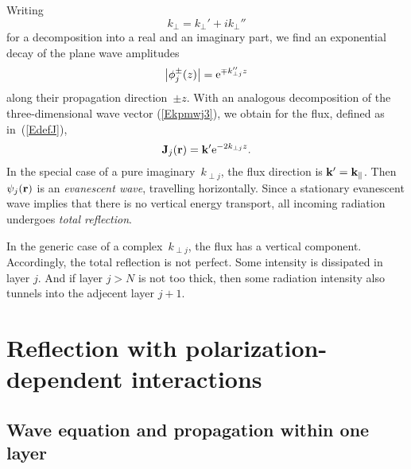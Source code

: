 Writing
\begin{equation}
  k_\perp = k_\perp' + i k_\perp''
\end{equation}
for a decomposition into a real and an imaginary part,
we find an exponential decay of the plane wave amplitudes
\begin{equation}\label{Ephidamp}
  \left|\phi^\pm_j(z)\right|
  = \text{e}^{\mp k_{\perp j}'' z}
\end{equation}
along their propagation direction~$\pm z$.
With an analogous decomposition
of the three-dimensional wave vector (\ref{Ekpmwj3}),
we obtain for the flux, defined as in~(\ref{EdefJ}),
\begin{equation}
  \mathbf{J}_j(\mathbf{r}) = \mathbf{k}' \text{e}^{-2k_{\perp j}z}.
\end{equation}
In the special case of a pure imaginary~$k_{\perp j}$,
the flux direction is $\mathbf{k}'=\mathbf{k}_\parallel$.
Then $\psi_j(\mathbf{r})$ is an \textit{evanescent wave},
%
travelling horizontally.
Since a stationary evanescent wave implies that there is
no vertical energy transport,
all incoming radiation undergoes \textit{total reflection}.
%

In the generic case of a complex~$k_{\perp j}$,
the flux has a vertical component.
Accordingly, the total reflection is not perfect.
Some intensity is dissipated in layer $j$.
%
And if layer $j>N$ is not too thick,
then some radiation intensity also tunnels into the adjecent layer $j+1$.
%


\section{Reflection with polarization-dependent interactions}\label{s:pol}



\subsection{Wave equation and propagation within one layer}

